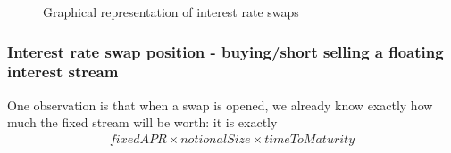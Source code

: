 \documentclass{article}%
\newcommand{\tikzPicScale}{0.8}
\newcommand\streamW{1.25}
\newcommand\streamH{3.5}
\newcommand\padding{0.5}
\newcommand{\streamSep}[2]{
    \draw[black, thick] ({#1 - 2}, #2) node[anchor=south west] {receive} node[anchor=north west] {pay} -- ({#1 + \streamW + \padding}, #2);
}
\begin{document}
\begin{figure}
    \caption{Graphical representation of interest rate swaps}
    \label{fig:swaps}
\end{figure}


\subsubsection{Interest rate swap position - buying/short selling a floating interest stream}
One observation is that when a swap is opened, we already know exactly how much the fixed stream will be worth: it is exactly
\begin{align*}fixedAPR \times notionalSize \times timeToMaturity\end{align*}
\end{document}
